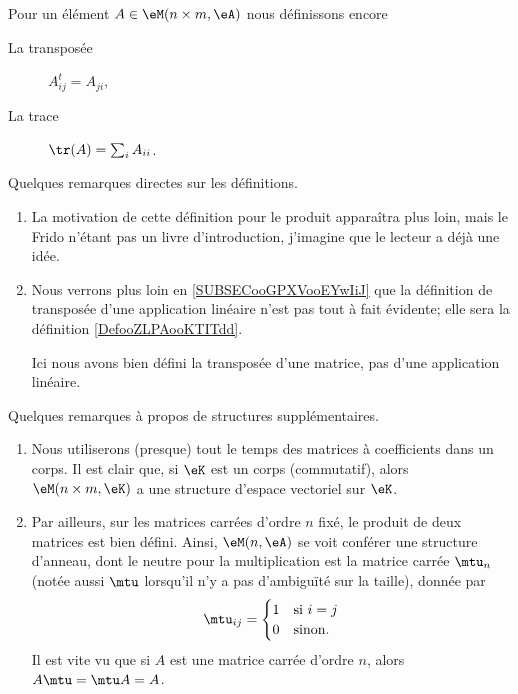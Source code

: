 \begin{definition}
	Pour un élément \( A\in \eM(n\times m, \eA)\) nous définissons encore
	\begin{description}
		\item[La transposée] \( A^t_{ij}=A_{ji}\),
		\item[La trace] \( \tr(A)=\sum_iA_{ii}\).
	\end{description}
\end{definition}


\begin{remark}
	Quelques remarques directes sur les définitions.
	\begin{enumerate}
		\item
		      La motivation de cette définition pour le produit apparaîtra plus loin, mais le Frido n'étant pas un livre d'introduction, j'imagine que le lecteur a déjà une idée.
		\item
		      Nous verrons plus loin en \ref{SUBSECooGPXVooEYwIiJ} que la définition de transposée d'une application linéaire n'est pas tout à fait évidente; elle sera la définition \ref{DefooZLPAooKTITdd}.

		      Ici nous avons bien défini la transposée d'une matrice, pas d'une application linéaire.
	\end{enumerate}
\end{remark}

\begin{remark}
	Quelques remarques à propos de structures supplémentaires.
	\begin{enumerate}
		\item Nous utiliserons (presque) tout le temps des matrices à coefficients dans un corps. Il est clair que, si \( \eK \) est un corps (commutatif), alors \( \eM(n\times m,\eK) \) a une structure d'espace vectoriel sur \( \eK \).
		\item Par ailleurs, sur les matrices carrées d'ordre \( n \) fixé, le produit de deux matrices est bien défini. Ainsi, \( \eM(n,\eA)\) se voit conférer une structure d'anneau, dont le neutre pour la multiplication est la matrice carrée \( \mtu_n\) (notée aussi \( \mtu\) lorsqu'il n'y a pas d'ambiguïté sur la taille), donnée par
		      \begin{equation}
			      \mtu_{ij}=\begin{cases}
				      1 & \text{si } i=j \\
				      0 & \text{sinon.}
			      \end{cases}
		      \end{equation}
		      Il est vite vu que si \( A\) est une matrice carrée d'ordre \( n \), alors \( A\mtu=\mtu A=A\).
	\end{enumerate}
\end{remark}


